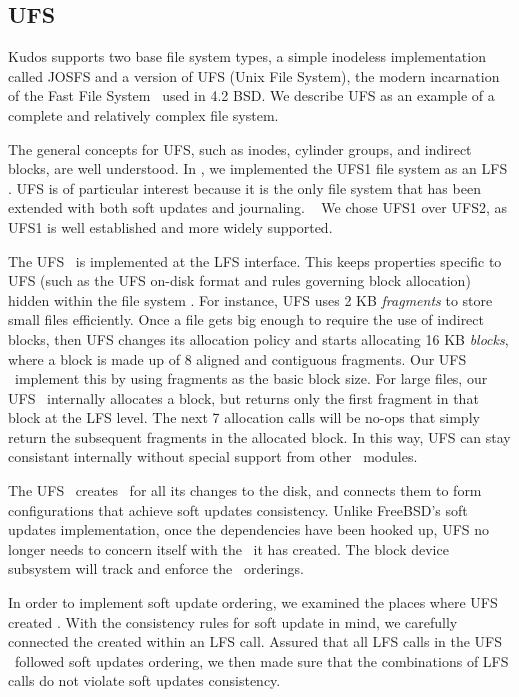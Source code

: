 
\subsection{UFS}
\label{sec:modules:ufs}

Kudos supports two base file system types, a simple inodeless
implementation called JOSFS and a version of UFS (Unix File System), the
modern incarnation of the Fast File System~\cite{mckusick84fast} used in
4.2 BSD. 
%
We describe UFS as an example of a complete and relatively complex file
system.

The general concepts for UFS, such as inodes, cylinder groups, and
indirect blocks, are well understood.  In \Kudos, we implemented the UFS1
file system as an LFS \module. UFS is of particular interest because it is
the only file system that has been extended with both soft updates and
journaling. ~\cite{seltzer00journaling} We chose UFS1 over UFS2, as UFS1 is
well established and more widely supported.

The UFS \module\ is implemented at the LFS interface. This keeps properties
specific to UFS (such as the UFS on-disk format and rules governing block
allocation) hidden within the file system \module. For instance, UFS uses
2 KB \emph{fragments} to store small files efficiently. Once a file gets big
enough to require the use of indirect blocks, then UFS changes its allocation
policy and starts allocating 16 KB \emph{blocks}, where a block is made up of 8
aligned and contiguous fragments. Our UFS \module\ implement this by using
fragments as the basic block size. For large files, our UFS \module\ internally
allocates a block, but returns only the first fragment in that block at the LFS
level. The next 7 allocation calls will be no-ops that simply return the
subsequent fragments in the allocated block. In this way, UFS can stay
consistant internally without special support from other \Kudos\ modules.

The UFS \module\ creates \chdescs\ for all its changes to the disk, and
connects them to form configurations that achieve soft updates consistency.
Unlike FreeBSD's soft updates implementation, once the dependencies have been
hooked up, UFS no longer needs to concern itself with the \chdescs\ it has
created. The block device subsystem will track and enforce the
\chdesc\ orderings.

In order to implement soft update ordering, we examined the places where UFS
created \chdescs. With the consistency rules for soft update in mind, we
carefully connected the \chdescs created within an LFS call. Assured that
all LFS calls in the UFS \module\ followed soft updates ordering, we then made
sure that the combinations of LFS calls do not violate soft updates
consistency.

